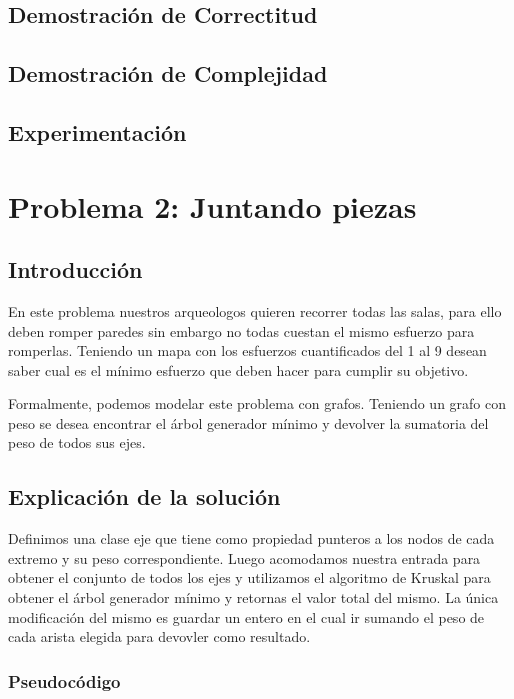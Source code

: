 \documentclass[spanish,12pt]{article}
\begin{document}
\subsection{Demostración de Correctitud}



\subsection{Demostración de Complejidad}


\subsection{Experimentación}

\section{Problema 2: Juntando piezas }

\subsection{Introducción}

En este problema nuestros arqueologos quieren recorrer todas las salas, para ello deben romper paredes sin embargo no todas cuestan el mismo esfuerzo para romperlas. Teniendo un mapa con los esfuerzos cuantificados del 1 al 9 desean saber cual es el mínimo esfuerzo que deben hacer para cumplir su objetivo.

Formalmente, podemos modelar este problema con grafos. Teniendo un grafo con peso se desea encontrar el árbol generador mínimo y devolver la sumatoria del peso de todos sus ejes.
\subsection{Explicación de la solución}

Definimos una clase eje que tiene como propiedad punteros a los nodos de cada extremo y su peso correspondiente.
Luego acomodamos nuestra entrada para obtener el conjunto de todos los ejes y utilizamos el algoritmo de Kruskal para obtener el árbol generador mínimo y retornas el valor total del mismo. La única modificación del mismo es guardar un entero en el cual ir sumando el peso de cada arista elegida para devovler como resultado.



\subsubsection{Pseudocódigo}
\end{document}
